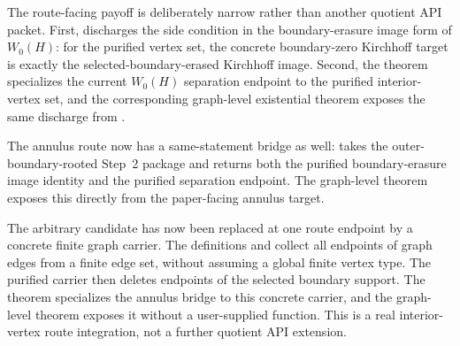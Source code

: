 \documentclass[11pt]{article}
\begin{document}
The route-facing payoff is deliberately narrow rather than another quotient API
packet.  First,
discharges the side condition in the boundary-erasure image form of \(W_0(H)\):
for the purified vertex set, the concrete boundary-zero Kirchhoff target is
exactly the selected-boundary-erased Kirchhoff image.  Second, the theorem
specializes the current \(W_0(H)\) separation endpoint to the purified
interior-vertex set, and the corresponding graph-level existential theorem
exposes the same discharge from
.

The annulus route now has a same-statement bridge as well:
takes the outer-boundary-rooted Step~2 package and returns both the purified
boundary-erasure image identity and the purified separation endpoint.  The
graph-level theorem
exposes this directly from the paper-facing annulus target.

The arbitrary candidate has now been replaced at one route endpoint by a
concrete finite graph carrier.  The definitions  and
 collect all endpoints of graph edges from a
finite edge set, without assuming a global finite vertex type.  The purified
carrier  then deletes endpoints of
the selected boundary support.  The theorem
specializes the annulus bridge to this concrete carrier, and the graph-level
theorem
exposes it without a user-supplied  function.  This is a real
interior-vertex route integration, not a further quotient API extension.
\end{document}
